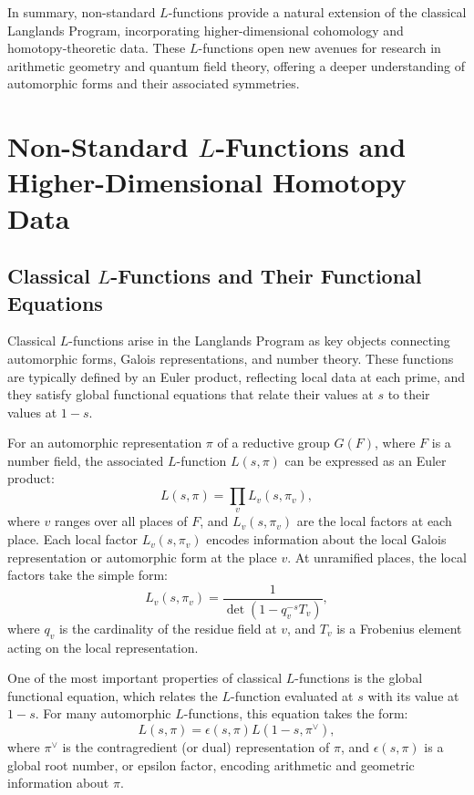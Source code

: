 \documentclass{article}
\theoremstyle{remark}
\begin{document}
In summary, non-standard $L$-functions provide a natural extension of the classical Langlands Program, incorporating higher-dimensional cohomology and homotopy-theoretic data. These $L$-functions open new avenues for research in arithmetic geometry and quantum field theory, offering a deeper understanding of automorphic forms and their associated symmetries.

\section{Non-Standard $L$-Functions and Higher-Dimensional Homotopy Data}

\subsection{Classical $L$-Functions and Their Functional Equations}

Classical $L$-functions arise in the Langlands Program as key objects connecting automorphic forms, Galois representations, and number theory. These functions are typically defined by an Euler product, reflecting local data at each prime, and they satisfy global functional equations that relate their values at $s$ to their values at $1 - s$.

For an automorphic representation $\pi$ of a reductive group $G(F)$, where $F$ is a number field, the associated $L$-function $L(s, \pi)$ can be expressed as an Euler product:
\[
L(s, \pi) = \prod_v L_v(s, \pi_v),
\]
where $v$ ranges over all places of $F$, and $L_v(s, \pi_v)$ are the local factors at each place. Each local factor $L_v(s, \pi_v)$ encodes information about the local Galois representation or automorphic form at the place $v$. At unramified places, the local factors take the simple form:
\[
L_v(s, \pi_v) = \frac{1}{\det(1 - q_v^{-s} T_v)},
\]
where $q_v$ is the cardinality of the residue field at $v$, and $T_v$ is a Frobenius element acting on the local representation.

One of the most important properties of classical $L$-functions is the global functional equation, which relates the $L$-function evaluated at $s$ with its value at $1 - s$. For many automorphic $L$-functions, this equation takes the form:
\[
L(s, \pi) = \epsilon(s, \pi) L(1 - s, \pi^\vee),
\]
where $\pi^\vee$ is the contragredient (or dual) representation of $\pi$, and $\epsilon(s, \pi)$ is a global root number, or epsilon factor, encoding arithmetic and geometric information about $\pi$.
\end{document}
